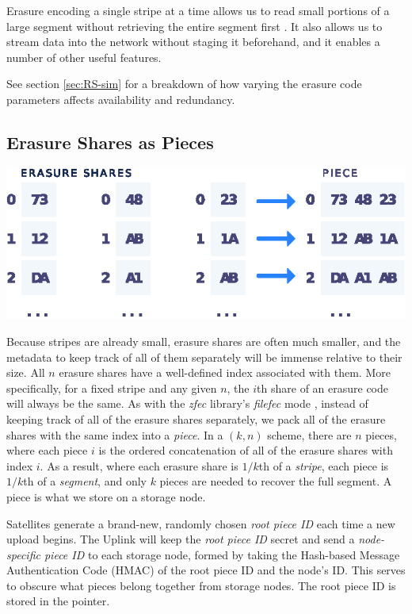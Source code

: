 \documentclass[8pt,fleqn,openany]{book}
\begin{document}
Erasure encoding
a single stripe at a time allows us to read small portions of a
large segment without retrieving the entire segment first \cite{rs-cd}.
It also allows us to stream data into the
network without staging it beforehand, and it enables a number of other useful
features.

See section \ref{sec:RS-sim} for a breakdown of how varying the erasure code
parameters affects availability and redundancy.

\subsection{Erasure Shares as Pieces}\label{erasure-shares-as-pieces}

\begin{center}
\includegraphics[width=.6\textwidth]{images/share-piece.eps}
\end{center}

Because stripes are already small, erasure shares are often much
smaller, and the metadata to keep track of all of them separately will be
immense relative to their size.
All $n$ erasure shares have a well-defined index associated
with them. More specifically, for
a fixed stripe and any given $n$, the $i$th share of an erasure
code will always be the same.
As with the {\em zfec} library's {\em filefec} mode \cite{filefec-packing},
instead of keeping track of all of the
erasure shares separately, we pack all of the erasure shares with the
same index into a {\em piece}.
In a $(k, n)$ scheme, there are $n$ pieces, where each
piece $i$ is the ordered concatenation of all of the erasure shares with
index $i$. As a result, where each erasure share is $1/k$th of a
{\em stripe}, each piece is $1/k$th of a {\em segment}, and only $k$
pieces are needed to recover the full segment.
A piece is what we store on a storage node.

Satellites generate a brand-new, randomly chosen {\em root piece ID} each time
a new upload begins. The Uplink will keep the {\em root piece ID} secret and send
a {\em node-specific piece ID} to each storage node, formed by taking the Hash-based
Message Authentication Code (HMAC) of the root piece ID and the node's ID.
This serves to obscure what pieces belong together from storage nodes.
The root piece ID is stored in the pointer.
\end{document}
